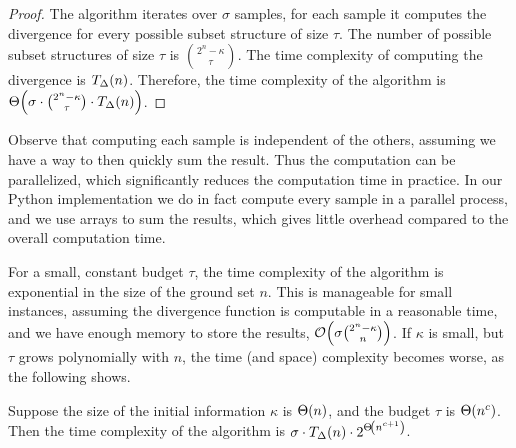\begin{proof}
  The algorithm iterates over $ \sigma $ samples, for each sample it computes the divergence for every possible subset structure of size $ \tau $.
  The number of possible subset structures of size $ \tau $ is $ \binom{2^n-\kappa}{\tau} $.
  The time complexity of computing the divergence is $ T_\Delta\!\left(n\right) $.
  Therefore, the time complexity of the \algFO{} algorithm is $ \Theta\!\left(\sigma \cdot \binom{2^n-\kappa}{\tau} \cdot T_\Delta\!\left(n\right)\right) $.
\end{proof}

Observe that computing each sample is independent of the others, assuming we have a way to then quickly sum the result.
Thus the computation can be parallelized, which significantly reduces the computation time in practice.
In our Python implementation \citep{gitrepo} we do in fact compute every sample in a parallel process, and we use  arrays to sum the results, which gives little overhead compared to the overall computation time.

For a small, constant budget $ \tau $, the time complexity of the \algFO{} algorithm is exponential in the size of the ground set $ n $.
This is manageable for small instances, assuming the divergence function is computable in a reasonable time, and we have enough memory to store the results, $ \mathcal{O}\!\left(\sigma \binom{2^n - \kappa}{n}\right)$.
If $ \kappa $ is small, but $ \tau $ grows polynomially with $ n $, the time (and space) complexity becomes worse, as the following  shows.

\begin{prop}[ ]
  \label{thm:algfo-time-complexity-poly-tau}
  Suppose the size of the initial information $ \kappa $ is $ \Theta\!\left(n\right) $, and the budget $ \tau $ is $ \Theta\!\left(n^c\right) $.
  Then the time complexity of the \algFO{} algorithm is $ \sigma \cdot T_\Delta\!\left(n\right) \cdot 2^{\Theta\!\left(n^{c+1}\right)}$.
\end{prop}


